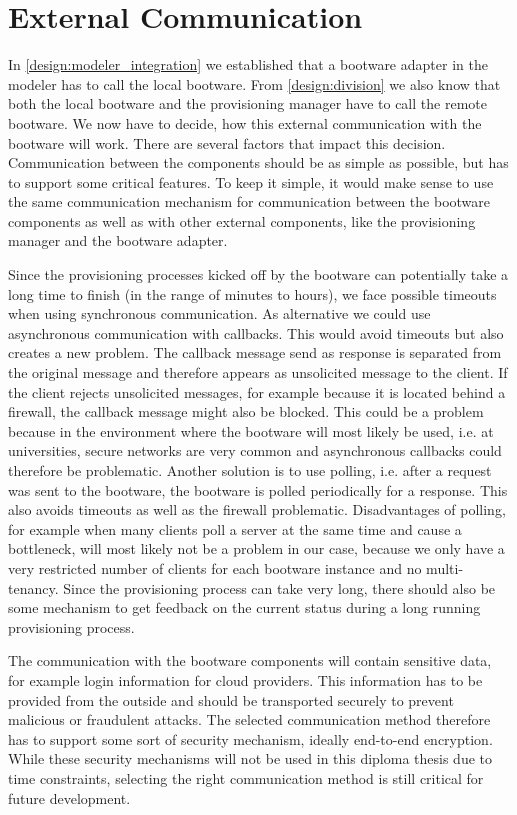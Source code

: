 \section{External Communication}
\label{design:communication}

In \autoref{design:modeler_integration} we established that a bootware adapter in the modeler has to call the local bootware.
From \autoref{design:division} we also know that both the local bootware and the provisioning manager have to call the remote bootware.
We now have to decide, how this external communication with the bootware will work.
There are several factors that impact this decision.
Communication between the components should be as simple as possible, but has to support some critical features.
To keep it simple, it would make sense to use the same communication mechanism for communication between the bootware components as well as with other external components, like the provisioning manager and the bootware adapter.

Since the provisioning processes kicked off by the bootware can potentially take a long time to finish (in the range of minutes to hours), we face possible timeouts when using synchronous communication.
As alternative we could use asynchronous communication with callbacks.
This would avoid timeouts but also creates a new problem.
The callback message send as response is separated from the original message and therefore appears as unsolicited message to the client.
If the client rejects unsolicited messages, for example because it is located behind a firewall, the callback message might also be blocked.
This could be a problem because in the environment where the bootware will most likely be used, i.e. at universities, secure networks are very common and asynchronous callbacks could therefore be problematic.
Another solution is to use polling, i.e. after a request was sent to the bootware, the bootware is polled periodically for a response.
This also avoids timeouts as well as the firewall problematic.
Disadvantages of polling, for example when many clients poll a server at the same time and cause a bottleneck, will most likely not be a problem in our case, because we only have a very restricted number of clients for each bootware instance and no multi-tenancy.
Since the provisioning process can take very long, there should also be some mechanism to get feedback on the current status during a long running provisioning process.

The communication with the bootware components will contain sensitive data, for example login information for cloud providers.
This information has to be provided from the outside and should be transported securely to prevent malicious or fraudulent attacks.
The selected communication method therefore has to support some sort of security mechanism, ideally end-to-end encryption.
While these security mechanisms will not be used in this diploma thesis due to time constraints, selecting the right communication method is still critical for future development.

